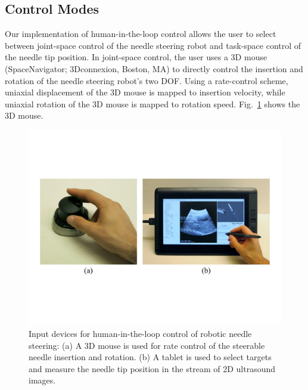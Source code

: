 \subsection{Control Modes}
Our implementation of human-in-the-loop control allows the user to select between joint-space control of the needle steering robot and task-space control of the needle tip position. In joint-space control, the user uses a 3D mouse (SpaceNavigator; 3Dconnexion, Boston, MA) to directly control the insertion and rotation of the needle steering robot's two DOF. Using a rate-control scheme, uniaxial displacement of the 3D mouse is mapped to insertion velocity, while uniaxial rotation of the 3D mouse is mapped to rotation speed. Fig.~\ref{fig:InputDevices} shows the 3D mouse.

\begin{figure}[!t]
\centering
\includegraphics[width = \columnwidth]{./Images/Chapter5/InputDevices/InputDevices.pdf}%
\caption[Input devices for robot control]{Input devices for human-in-the-loop control of robotic needle steering: (a) A 3D mouse is used for rate control of the steerable needle insertion and rotation. (b) A tablet is used to select targets and measure the needle tip position in the stream of 2D ultrasound images.}
\label{fig:InputDevices}
\end{figure}  

